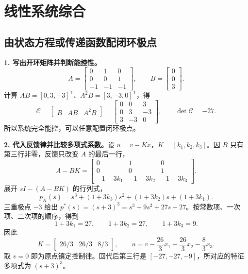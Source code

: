 \chapter{线性系统综合}

\section{由状态方程或传递函数配闭环极点}



\sol\textbf{1. 写出开环矩阵并判断能控性。}
\[
    A=\begin{bmatrix}0&1&0\\0&0&1\\-1&-1&-1\end{bmatrix},
    \qquad B=\begin{bmatrix}0\\0\\3\end{bmatrix}.
\]
计算 $AB=[0,3,-3]^{\mathsf T}$、$A^2B=[3,-3,0]^{\mathsf T}$，得
\[
    \mathcal C=\begin{bmatrix}B&AB&A^2B\end{bmatrix}
    =\begin{bmatrix}0&0&3\\0&3&-3\\3&-3&0\end{bmatrix},
    \qquad \det\mathcal C=-27 .
\]
所以系统完全能控，可以任意配置闭环极点。

\textbf{2. 代入反馈律并比较多项式系数。}设 $u=v-Kx$，$K=[k_1,k_2,k_3]$。因 $B$ 只有第三行非零，反馈只改变 $A$ 的最后一行，
\[
    A-BK=\begin{bmatrix}
        0&1&0\\0&0&1\\
        -1-3k_1&-1-3k_2&-1-3k_3
    \end{bmatrix}.
\]
展开 $sI-(A-BK)$ 的行列式，
\[
    p_K(s)=s^3+(1+3k_3)s^2+(1+3k_2)s+(1+3k_1).
\]
三重极点 $-3$ 给出 $p^\ast(s)=(s+3)^3=s^3+9s^2+27s+27$。按常数项、一次项、二次项的顺序，得到
\[
    1+3k_1=27,\qquad 1+3k_2=27,\qquad 1+3k_3=9.
\]
因此
\[
    \boxed{K=\begin{bmatrix}26/3&26/3&8/3\end{bmatrix}},
    \qquad
    u=v-\frac{26}{3}x_1-\frac{26}{3}x_2-\frac{8}{3}x_3 .
\]
取 $v=0$ 即为原点镇定控制律。回代后第三行是 $[-27,-27,-9]$，所对应的特征多项式为 $(s+3)^3$。

